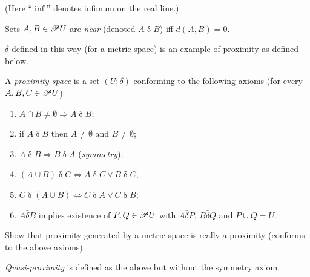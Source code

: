 (Here ``$\inf$'' denotes infimum on the real line.)
\begin{defn}
Sets $A,B\in\mathscr{P} U$ are \emph{near} (denoted $A\mathrel\delta B$)
iff $d(A,B)=0$.
\end{defn}
$\delta$ defined in this way (for a metric space) is an example of
proximity as defined below.
\begin{defn}
\label{prox}A \emph{proximity
space} is a set $(U;\delta)$ conforming to the following axioms (for
every $A,B,C\in\mathscr{P} U$):
\begin{enumerate}
\item $A\cap B\ne\emptyset\Rightarrow A\mathrel\delta B$;
\item if $A\mathrel\delta B$ then $A\ne\emptyset$ and $B\ne\emptyset$;
\item $A\mathrel\delta B\Rightarrow B\mathrel\delta A$ (\emph{symmetry});
\item $(A\cup B)\mathrel\delta C\Leftrightarrow A\mathrel\delta C\lor B\mathrel\delta C$;
\item $C\mathrel\delta(A\cup B)\Leftrightarrow C\mathrel\delta A\lor C\mathrel\delta B$;
\item \label{prox-last}$A\mathrel{\bar{\delta}}B$ implies existence of
$P,Q\in\mathscr{P} U$ with $A\mathrel{\bar{\delta}}P$, $B\mathrel{\bar{\delta}}Q$
and $P\cup Q=U$.
\end{enumerate}
\end{defn}
\begin{xca}
Show that proximity generated by a metric space is really a proximity
(conforms to the above axioms).\end{xca}
\begin{defn}
\emph{Quasi-proximity} is defined as the above
but without the symmetry axiom.
\end{defn}

